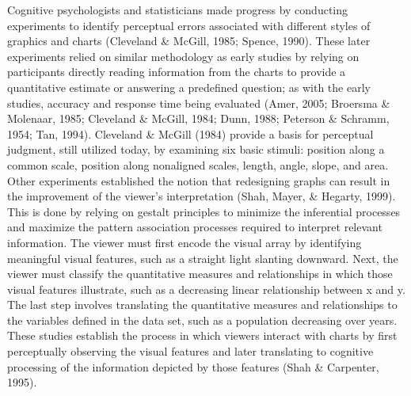 \documentclass[print]{nuthesis}
\begin{document}
Cognitive psychologists and statisticians made progress by conducting experiments to identify perceptual errors  associated with different styles of graphics and charts (Cleveland \& McGill, 1985; Spence, 1990).
These later experiments relied on similar methodology as early studies by relying on participants directly reading information from the charts to provide a quantitative estimate or answering a predefined question; as with the early studies, accuracy and response time being evaluated (Amer, 2005; Broersma \& Molenaar, 1985; Cleveland \& McGill, 1984; Dunn, 1988; Peterson \& Schramm, 1954; Tan, 1994). 
Cleveland \& McGill (1984) provide a basis for perceptual judgment, still utilized today, by examining six basic stimuli: position along a common scale, position along nonaligned scales, length, angle, slope, and area.
Other experiments established the notion that redesigning graphs can result in the improvement of the viewer's interpretation (Shah, Mayer, \& Hegarty, 1999).
This is done by relying on gestalt principles to minimize the inferential processes and maximize the pattern association processes required to interpret relevant information. 
The viewer must first encode the visual array by identifying meaningful visual features, such as a straight light slanting downward.
Next, the viewer must classify the quantitative measures and relationships in which those visual features illustrate, such as a decreasing linear relationship between x and y.
The last step involves translating the quantitative measures and relationships to the variables defined in the data set, such as a population decreasing over years. 
These studies establish the process in which viewers interact with charts by first perceptually observing the visual features and later translating to cognitive processing of the information depicted by those features (Shah \& Carpenter, 1995).
\end{document}

